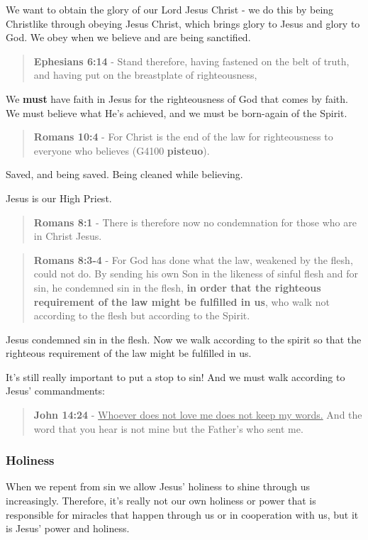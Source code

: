 \documentclass[11pt]{article}
\begin{document}
We want to obtain the glory of our Lord Jesus Christ - we do this by being Christlike through obeying Jesus Christ, which brings glory to Jesus and glory to God. We obey when we believe and are being sanctified.

\begin{quote}
\textbf{Ephesians 6:14} - Stand therefore, having fastened on the belt of truth, and having put on the breastplate of righteousness,
\end{quote}

We \textbf{must} have faith in Jesus for the righteousness of God that comes by faith.
We must believe what He's achieved, and we must be born-again of the Spirit.

\begin{quote}
\textbf{Romans 10:4} - For Christ is the end of the law for righteousness to everyone who believes (G4100 \textbf{pisteuo}).
\end{quote}

Saved, and being saved. Being cleaned while believing.

Jesus is our High Priest.

\begin{quote}
\textbf{Romans 8:1} - There is therefore now no condemnation for those who are in Christ Jesus.
\end{quote}

\begin{quote}
\textbf{Romans 8:3-4} - For God has done what the law, weakened by the flesh, could not do. By sending his own Son in the likeness of sinful flesh and for sin, he condemned sin in the flesh, \textbf{in order that the righteous requirement of the law might be fulfilled in us}, who walk not according to the flesh but according to the Spirit.
\end{quote}

Jesus condemned sin in the flesh. Now we walk according to the spirit so that the righteous requirement of the law might be fulfilled in us.

It's still really important to put a stop to sin! And we must walk according to Jesus' commandments:

\begin{quote}
\textbf{John 14:24} - \uline{Whoever does not love me does not keep my words.} And the word that you hear is not mine but the Father's who sent me.
\end{quote}

\subsubsection{Holiness}
\label{sec:org1fe1afe}
When we repent from sin we allow Jesus' holiness to shine through us increasingly.
Therefore, it's really not our own holiness or power that is responsible for miracles that happen through us or in cooperation with us, but it is Jesus' power and holiness.
\end{document}
